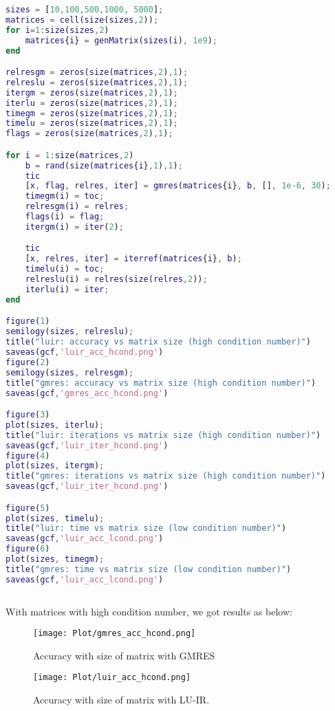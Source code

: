 \begin{lstlisting}[language=Matlab,caption=Matrix with high contional number]
sizes = [10,100,500,1000, 5000];
matrices = cell(size(sizes,2));
for i=1:size(sizes,2)
    matrices{i} = genMatrix(sizes(i), 1e9);
end

relresgm = zeros(size(matrices,2),1);
relreslu = zeros(size(matrices,2),1);
itergm = zeros(size(matrices,2),1);
iterlu = zeros(size(matrices,2),1);
timegm = zeros(size(matrices,2),1);
timelu = zeros(size(matrices,2),1);
flags = zeros(size(matrices,2),1);

for i = 1:size(matrices,2)
    b = rand(size(matrices{i},1),1);
    tic
    [x, flag, relres, iter] = gmres(matrices{i}, b, [], 1e-6, 30);
    timegm(i) = toc;
    relresgm(i) = relres;
    flags(i) = flag;
    itergm(i) = iter(2);

    tic
    [x, relres, iter] = iterref(matrices{i}, b);
    timelu(i) = toc;
    relreslu(i) = relres(size(relres,2));
    iterlu(i) = iter;
end

figure(1)
semilogy(sizes, relreslu);
title("luir: accuracy vs matrix size (high condition number)")
saveas(gcf,'luir_acc_hcond.png')
figure(2)
semilogy(sizes, relresgm);
title("gmres: accuracy vs matrix size (high condition number)")
saveas(gcf,'gmres_acc_hcond.png')

figure(3)
plot(sizes, iterlu);
title("luir: iterations vs matrix size (high condition number)")
saveas(gcf,'luir_iter_hcond.png')
figure(4)
plot(sizes, itergm);
title("gmres: iterations vs matrix size (high condition number)")
saveas(gcf,'luir_iter_hcond.png')

figure(5)
plot(sizes, timelu);
title("luir: time vs matrix size (low condition number)")
saveas(gcf,'luir_acc_lcond.png')
figure(6)
plot(sizes, timegm);
title("gmres: time vs matrix size (low condition number)")
saveas(gcf,'luir_acc_lcond.png')
   
\end{lstlisting}
With matrices with high condition number, we got results as below:
\begin{figure}[ht]
     \begin{minipage}[b]{0.5\linewidth}
        \centering
   \texttt{[image: Plot/gmres\_acc\_hcond.png]}
        \caption{Accuracy with size of matrix with GMRES}
        \label{fig:image13}
    \end{minipage}
    \hspace{0.5cm} 
    \begin{minipage}[b]{0.5\linewidth}
        \centering
        \texttt{[image: Plot/luir\_acc\_hcond.png]}
        \caption{Accuracy with size of matrix with LU-IR.}
        \label{fig:image14}
    \end{minipage}
\end{figure}

